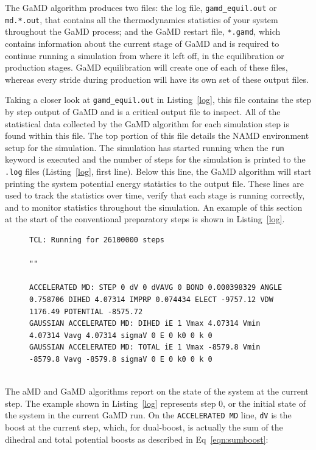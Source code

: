 \documentclass[9pt,tutorial,pubversion]{livecoms}
\begin{document}
The GaMD algorithm produces two files: the log file, \texttt{gamd\_equil.out} or \texttt{md.*.out}, that contains all the thermodynamics statistics of your system throughout the GaMD process; and the GaMD restart file, \texttt{*.gamd}, which contains information about the current stage of GaMD and is required to continue running a simulation from where it left off, in the equilibration or production stages. GaMD equilibration will create one of each of these files, whereas every stride during production will have its own set of these output files.

Taking a closer look at \texttt{gamd\_equil.out} in Listing~\ref{log}, this file contains the step by step output of GaMD and is a critical output file to inspect. All of the statistical data collected by the GaMD algorithm for each simulation step is found within this file. The top portion of this file details the NAMD environment setup for the simulation. The simulation has started running when the \texttt{run} keyword is executed and the number of steps for the simulation is printed to the \texttt{.log} files (Listing~\ref{log}, first line). Below this line, the GaMD algorithm will start printing the system potential energy statistics to the output file. These lines are used to track the statistics over time, verify that each stage is running correctly, and to monitor statistics throughout the simulation. An example of this section at the start of the conventional preparatory steps is shown in Listing~\ref{log}.

\begin{figure}[h!]
\begin{lstlisting}[label=log,caption=gamd\_equil.out, basicstyle=\small,breaklines=true, backgroundcolor=\color{light-gray}]
TCL: Running for 26100000 steps

""

ACCELERATED MD: STEP 0 dV 0 dVAVG 0 BOND 0.000398329 ANGLE 0.758706 DIHED 4.07314 IMPRP 0.074434 ELECT -9757.12 VDW 1176.49 POTENTIAL -8575.72
GAUSSIAN ACCELERATED MD: DIHED iE 1 Vmax 4.07314 Vmin 4.07314 Vavg 4.07314 sigmaV 0 E 0 k0 0 k 0
GAUSSIAN ACCELERATED MD: TOTAL iE 1 Vmax -8579.8 Vmin -8579.8 Vavg -8579.8 sigmaV 0 E 0 k0 0 k 0
   
\end{lstlisting}
\end{figure}

The aMD and GaMD algorithms report on the state of the system at the current step. The example shown in Listing~\ref{log} represents step 0, or the initial state of the system in the current GaMD run. On the \texttt{ACCELERATED MD} line, \texttt{dV} is the boost at the current step, which, for dual-boost, is actually the sum of the dihedral and total potential boosts as described in Eq~\ref{eqn:sumboost}: 
\end{document}
